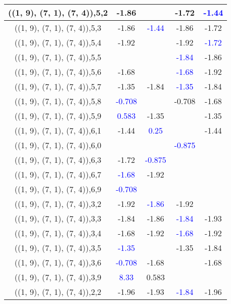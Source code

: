 \documentclass{article}
\begin{document}
\begin{center}
\begin{longtable}{|c|c|c|c|c|}
        	\hline
        	((1, 9), (7, 1), (7, 4)),5,2&-1.86&&-1.72& \textcolor{blue}{-1.44}\\
        	\hline
        	((1, 9), (7, 1), (7, 4)),5,3&-1.86& \textcolor{blue}{-1.44}&-1.86&-1.72\\
        	\hline
        	((1, 9), (7, 1), (7, 4)),5,4&-1.92&&-1.92& \textcolor{blue}{-1.72}\\
        	\hline
        	((1, 9), (7, 1), (7, 4)),5,5&&& \textcolor{blue}{-1.84}&-1.86\\
        	\hline
        	((1, 9), (7, 1), (7, 4)),5,6&-1.68&& \textcolor{blue}{-1.68}&-1.92\\
        	\hline
        	((1, 9), (7, 1), (7, 4)),5,7&-1.35&-1.84& \textcolor{blue}{-1.35}&-1.84\\
        	\hline
        	((1, 9), (7, 1), (7, 4)),5,8& \textcolor{blue}{-0.708}&&-0.708&-1.68\\
        	\hline
        	((1, 9), (7, 1), (7, 4)),5,9& \textcolor{blue}{0.583}&-1.35&&-1.35\\
        	\hline
        	((1, 9), (7, 1), (7, 4)),6,1&-1.44& \textcolor{blue}{0.25}&&-1.44\\
        	\hline
        	((1, 9), (7, 1), (7, 4)),6,0&&& \textcolor{blue}{-0.875}&\\
        	\hline
        	((1, 9), (7, 1), (7, 4)),6,3&-1.72& \textcolor{blue}{-0.875}&&\\
        	\hline
        	((1, 9), (7, 1), (7, 4)),6,7& \textcolor{blue}{-1.68}&-1.92&&\\
        	\hline
        	((1, 9), (7, 1), (7, 4)),6,9& \textcolor{blue}{-0.708}&&&\\
        	\hline
        	((1, 9), (7, 1), (7, 4)),3,2&-1.92& \textcolor{blue}{-1.86}&-1.92&\\
        	\hline
        	((1, 9), (7, 1), (7, 4)),3,3&-1.84&-1.86& \textcolor{blue}{-1.84}&-1.93\\
        	\hline
        	((1, 9), (7, 1), (7, 4)),3,4&-1.68&-1.92& \textcolor{blue}{-1.68}&-1.92\\
        	\hline
        	((1, 9), (7, 1), (7, 4)),3,5& \textcolor{blue}{-1.35}&&-1.35&-1.84\\
        	\hline
        	((1, 9), (7, 1), (7, 4)),3,6& \textcolor{blue}{-0.708}&-1.68&&-1.68\\
        	\hline
        	((1, 9), (7, 1), (7, 4)),3,9& \textcolor{blue}{8.33}&0.583&&\\
        	\hline
        	((1, 9), (7, 1), (7, 4)),2,2&-1.96&-1.93& \textcolor{blue}{-1.84}&-1.96\\

\end{longtable}
\end{center}
\end{document}
